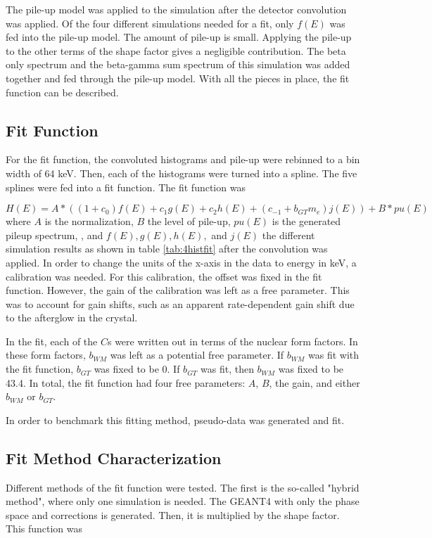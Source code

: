 \documentclass[../MaxHughesThesis.tex]{subfiles}
\begin{document}
The pile-up model was applied to the simulation after the detector convolution was applied. 
Of the four different simulations needed for a fit, only $f(E)$ was fed into the pile-up model.
The amount of pile-up is small. 
Applying the pile-up to the other terms of the shape factor gives a negligible contribution.
The beta only spectrum and the beta-gamma sum spectrum of this simulation was added together and fed through the pile-up model.
With all the pieces in place, the fit function can be described. 

\subsection{Fit Function}
For the fit function, the convoluted histograms and pile-up were rebinned to a bin width of 64 keV.
Then, each of the histograms were turned into a spline. 
The five splines were fed into a fit function.
The fit function was

\begin{equation}
	H(E) = A * (( 1 + c_{0}) f(E) + c_{1}g(E) + c_{2} h(E) + (c_{-1} + b_{GT} m_{e}) j(E)) + B * pu(E)
	\label{eq:betafit}
\end{equation}
where $A$ is the normalization, $B$ the level of pile-up, $pu(E)$ is the generated pileup spectrum, , and $f(E),g(E),h(E),$ and $j(E)$ the different simulation results as shown in table \ref{tab:4histfit} after the convolution was applied.
In order to change the units of the x-axis in the data to energy in keV, a calibration was needed.
For this calibration, the offset was fixed in the fit function.
However, the gain of the calibration was left as a free parameter.
This was to account for gain shifts, such as an apparent rate-dependent gain shift due to the afterglow in the crystal.

In the fit, each of the $C$s were written out in terms of the nuclear form factors.
In these form factors, $b_{WM}$ was left as a potential free parameter. 
If $b_{WM}$ was fit with the fit function, $b_{GT}$ was fixed to be 0. 
If $b_{GT}$ was fit, then $b_{WM}$ was fixed to be 43.4. 
In total, the fit function had four free parameters:
$A$, $B$, the gain, and either $b_{WM}$ or $b_{GT}$. 

In order to benchmark this fitting method, pseudo-data was generated and fit.

\subsection{Fit Method Characterization}
Different methods of the fit function were tested. 
The first is the so-called "hybrid method", where only one simulation is needed.
The GEANT4 with only the phase space and corrections is generated. 
Then, it is multiplied by the shape factor.
This function was 
\end{document}
